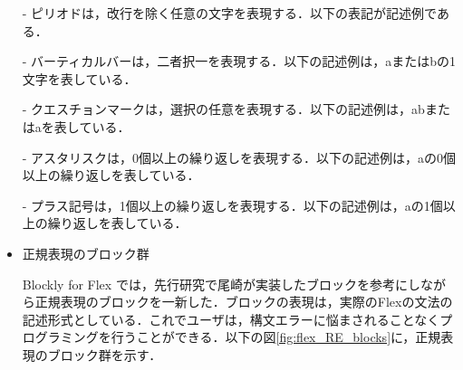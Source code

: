 \documentclass{risepaper}
\begin{document}
\begin{itemize}
\shadowbox{
\begin{minipage}[t]{3cm}
\begin{verbatim}
[^0-9]
\end{verbatim}
\end{minipage}
}

- ピリオドは，改行を除く任意の文字を表現する．以下の表記が記述例である．


- バーティカルバーは，二者択一を表現する．以下の記述例は，aまたはbの1文字を表している．


- クエスチョンマークは，選択の任意を表現する．以下の記述例は，abまたはaを表している．


- アスタリスクは，0個以上の繰り返しを表現する．以下の記述例は，aの0個以上の繰り返しを表している．


- プラス記号は，1個以上の繰り返しを表現する．以下の記述例は，aの1個以上の繰り返しを表している．


\item 正規表現のブロック群

Blockly for Flex では，先行研究で尾崎が実装したブロックを参考にしながら正規表現のブロックを一新した．ブロックの表現は，実際のFlexの文法の記述形式としている．これでユーザは，構文エラーに悩まされることなくプログラミングを行うことができる．以下の図\ref{fig:flex_RE_blocks}に，正規表現のブロック群を示す．


\end{itemize}
\end{document}
